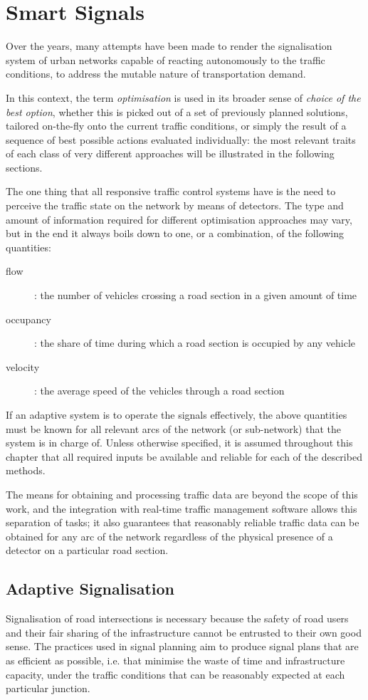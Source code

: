 \chapter{Smart Signals}
Over the years, many attempts have been made to render the signalisation system of urban networks capable of reacting autonomously to the traffic conditions, to address the mutable nature of transportation demand.

In this context, the term \emph{optimisation} is used in its broader sense of \emph{choice of the best option}, whether this is picked out of a set of previously planned solutions, tailored on-the-fly onto the current traffic conditions, or simply the result of a sequence of best possible actions evaluated individually: the most relevant traits of each class of very different approaches will be illustrated in the following sections.

The one thing that all responsive traffic control systems have is the need to perceive the traffic state on the network by means of detectors. The type and amount of information required for different optimisation approaches may vary, but in the end it always boils down to one, or a combination, of the following quantities:
\begin{description}
\item[flow]: the number of vehicles crossing a road section in a given amount of time 
\item[occupancy]: the share of time during which a road section is occupied by any vehicle \units{\%}
\item[velocity]: the average speed of the vehicles through a road section 
\end{description}
If an adaptive system is to operate the signals effectively, the above quantities must be known for all relevant arcs of the network (or sub-network) that the system is in charge of. Unless otherwise specified, it is assumed throughout this chapter that all required inputs be available and reliable for each of the described methods.

The means for obtaining and processing traffic data are beyond the scope of this work, and the integration with real-time traffic management software allows this separation of tasks; it also guarantees that reasonably reliable traffic data can be obtained for any arc of the network regardless of the physical presence of a detector on a particular road section.


\section{Adaptive Signalisation}
Signalisation of road intersections is necessary because the safety of road users and their fair sharing of the infrastructure cannot be entrusted to their own good sense. The practices used in signal planning aim to produce signal plans that are as efficient as possible, i.e. that minimise the waste of time and infrastructure capacity, under the traffic conditions that can be reasonably expected at each particular junction.

